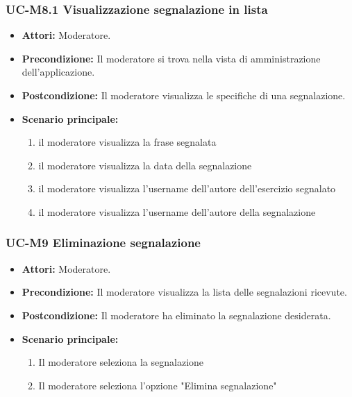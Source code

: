 \subsubsection{UC-M8.1 Visualizzazione segnalazione in lista}
\begin{itemize}
	\item \textbf{Attori:} Moderatore.
	\item \textbf{Precondizione:} Il moderatore si trova nella vista di amministrazione dell'applicazione.
	\item \textbf{Postcondizione:} Il moderatore visualizza le specifiche di una segnalazione.
	\item \textbf{Scenario principale:}
	\begin{enumerate}
		\item il moderatore visualizza la frase segnalata
		\item il moderatore visualizza la data della segnalazione
		\item il moderatore visualizza l'username dell'autore dell'esercizio segnalato
		\item il moderatore visualizza l'username dell'autore della segnalazione
	\end{enumerate}
\end{itemize}

\subsubsection{UC-M9 Eliminazione segnalazione}
\begin{itemize}
	\item \textbf{Attori:} Moderatore.
	\item \textbf{Precondizione:} Il moderatore visualizza la lista delle segnalazioni ricevute.
	\item \textbf{Postcondizione:} Il moderatore ha eliminato la segnalazione desiderata.
	\item \textbf{Scenario principale:}
	\begin{enumerate}
		\item Il moderatore seleziona la segnalazione
		\item Il moderatore seleziona l'opzione "Elimina segnalazione"
	\end{enumerate}
\end{itemize}

